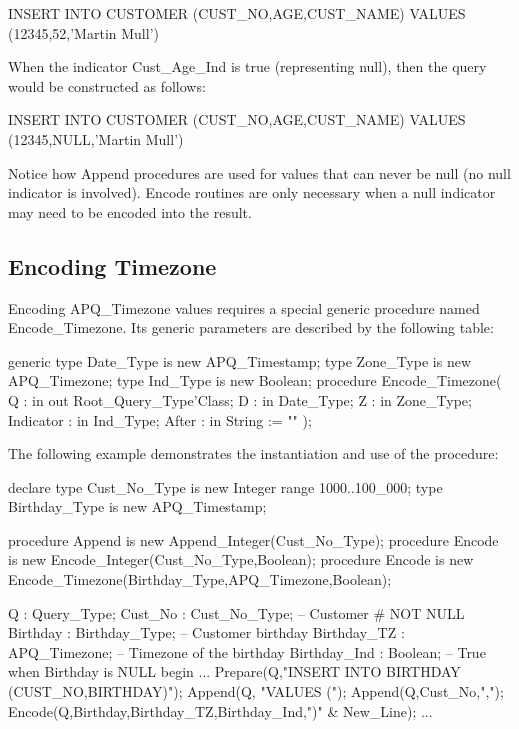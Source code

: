 \documentclass[english,letterpaper]{book}
\begin{document}
\begin{SQL}
INSERT INTO CUSTOMER (CUST_NO,AGE,CUST_NAME)
VALUES (12345,52,'Martin Mull')
\end{SQL}

When the indicator Cust\_Age\_Ind is true (representing null), then the
query would be constructed as follows:

\begin{SQL}
INSERT INTO CUSTOMER (CUST_NO,AGE,CUST_NAME)
VALUES (12345,NULL,'Martin Mull')
\end{SQL}

Notice how Append procedures are used for values that can never be
null (no null indicator is involved). Encode routines are only necessary
when a null indicator may need to be encoded into the result.


\subsection{Encoding Timezone}

Encoding APQ\_Timezone values requires a special generic procedure
named Encode\-\_Timezone. Its generic parameters are described by the
following table:

\begin{Code}
generic
   type Date_Type is new APQ_Timestamp;
   type Zone_Type is new APQ_Timezone;
   type Ind_Type is new Boolean;
procedure Encode_Timezone(
   Q :         in out Root_Query_Type'Class;
   D :         in     Date_Type;
   Z :         in     Zone_Type;
   Indicator : in     Ind_Type;
   After :     in     String := ""
);
\end{Code}

The following example demonstrates the instantiation and use of the
procedure:\label{Birthday Timezone Example}

\begin{Example}
declare
   type Cust_No_Type is new Integer range 1000..100_000;
   type Birthday_Type is new APQ_Timestamp;

   procedure Append is new Append_Integer(Cust_No_Type);
   procedure Encode is new
      Encode_Integer(Cust_No_Type,Boolean);
   procedure Encode is new
      Encode_Timezone(Birthday_Type,APQ_Timezone,Boolean);

   Q :            Query_Type;
   Cust_No :      Cust_No_Type;  -- Customer # NOT NULL
   Birthday :     Birthday_Type; -- Customer birthday
   Birthday_TZ :  APQ_Timezone;  -- Timezone of the birthday
   Birthday_Ind : Boolean;       -- True when Birthday is NULL
begin
   ...
   Prepare(Q,"INSERT INTO BIRTHDAY (CUST_NO,BIRTHDAY)");
   Append(Q, "VALUES (");
   Append(Q,Cust_No,",");
   Encode(Q,Birthday,Birthday_TZ,Birthday_Ind,")" & New_Line);
   ...
\end{Example}
\end{document}
